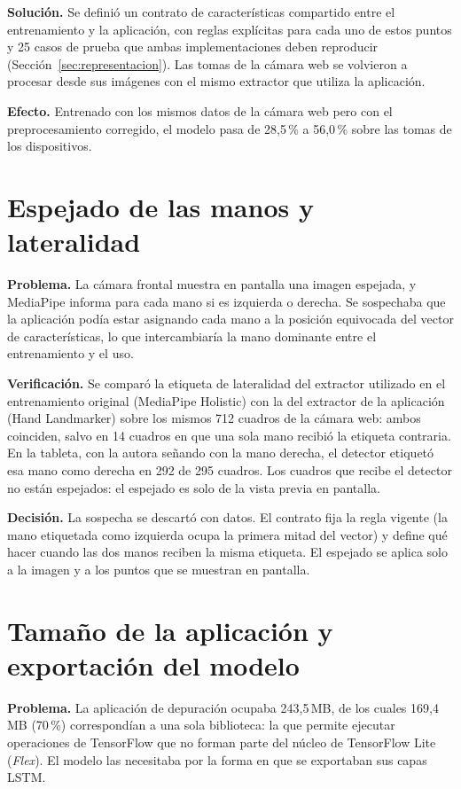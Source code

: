 \textbf{Solución.} Se definió un contrato de características compartido entre el entrenamiento y la aplicación, con reglas explícitas para cada uno de estos puntos y 25 casos de prueba que ambas implementaciones deben reproducir (Sección~\ref{sec:representacion}). Las tomas de la cámara web se volvieron a procesar desde sus imágenes con el mismo extractor que utiliza la aplicación.

\textbf{Efecto.} Entrenado con los mismos datos de la cámara web pero con el preprocesamiento corregido, el modelo pasa de 28,5\,\% a 56,0\,\% sobre las tomas de los dispositivos.

\section{Espejado de las manos y lateralidad}

\textbf{Problema.} La cámara frontal muestra en pantalla una imagen espejada, y MediaPipe informa para cada mano si es izquierda o derecha. Se sospechaba que la aplicación podía estar asignando cada mano a la posición equivocada del vector de características, lo que intercambiaría la mano dominante entre el entrenamiento y el uso.

\textbf{Verificación.} Se comparó la etiqueta de lateralidad del extractor utilizado en el entrenamiento original (MediaPipe Holistic) con la del extractor de la aplicación (Hand Landmarker) sobre los mismos 712 cuadros de la cámara web: ambos coinciden, salvo en 14 cuadros en que una sola mano recibió la etiqueta contraria. En la tableta, con la autora señando con la mano derecha, el detector etiquetó esa mano como derecha en 292 de 295 cuadros. Los cuadros que recibe el detector no están espejados: el espejado es solo de la vista previa en pantalla.

\textbf{Decisión.} La sospecha se descartó con datos. El contrato fija la regla vigente (la mano etiquetada como izquierda ocupa la primera mitad del vector) y define qué hacer cuando las dos manos reciben la misma etiqueta. El espejado se aplica solo a la imagen y a los puntos que se muestran en pantalla.

\section{Tamaño de la aplicación y exportación del modelo}

\textbf{Problema.} La aplicación de depuración ocupaba 243,5\,MB, de los cuales 169,4\,MB (70\,\%) correspondían a una sola biblioteca: la que permite ejecutar operaciones de TensorFlow que no forman parte del núcleo de TensorFlow Lite (\emph{Flex}). El modelo las necesitaba por la forma en que se exportaban sus capas LSTM.

